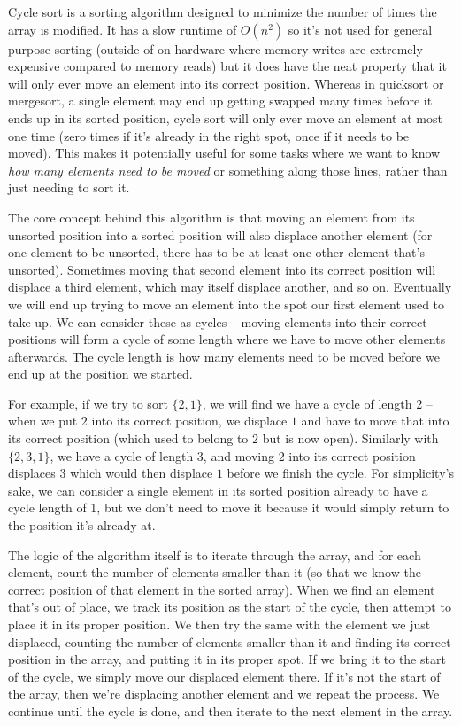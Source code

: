 Cycle sort is a sorting algorithm designed to minimize the number of times the array is modified. It has a slow runtime of $O(n^2)$ so it's not used for general purpose sorting (outside of on hardware where memory writes are extremely expensive compared to memory reads) but it does have the neat property that it will only ever move an element into its correct position. Whereas in quicksort or mergesort, a single element may end up getting swapped many times before it ends up in its sorted position, cycle sort will only ever move an element at most one time (zero times if it's already in the right spot, once if it needs to be moved). This makes it potentially useful for some tasks where we want to know \textit{how many elements need to be moved} or something along those lines, rather than just needing to sort it.

The core concept behind this algorithm is that moving an element from its unsorted position into a sorted position will also displace another element (for one element to be unsorted, there has to be at least one other element that's unsorted). Sometimes moving that second element into its correct position will displace a third element, which may itself displace another, and so on. Eventually we will end up trying to move an element into the spot our first element used to take up. We can consider these as cycles -- moving elements into their correct positions will form a cycle of some length where we have to move other elements afterwards. The cycle length is how many elements need to be moved before we end up at the position we started.

For example, if we try to sort $\{2,1\}$, we will find we have a cycle of length 2 -- when we put $2$ into its correct position, we displace $1$ and have to move that into its correct position (which used to belong to $2$ but is now open). Similarly with $\{2,3,1\}$, we have a cycle of length 3, and moving $2$ into its correct position displaces $3$ which would then displace $1$ before we finish the cycle. For simplicity's sake, we can consider a single element in its sorted position already to have a cycle length of 1, but we don't need to move it because it would simply return to the position it's already at.

The logic of the algorithm itself is to iterate through the array, and for each element, count the number of elements smaller than it (so that we know the correct position of that element in the sorted array). When we find an element that's out of place, we track its position as the start of the cycle, then attempt to place it in its proper position. We then try the same with the element we just displaced, counting the number of elements smaller than it and finding its correct position in the array, and putting it in its proper spot. If we bring it to the start of the cycle, we simply move our displaced element there. If it's not the start of the array, then we're displacing another element and we repeat the process. We continue until the cycle is done, and then iterate to the next element in the array.

